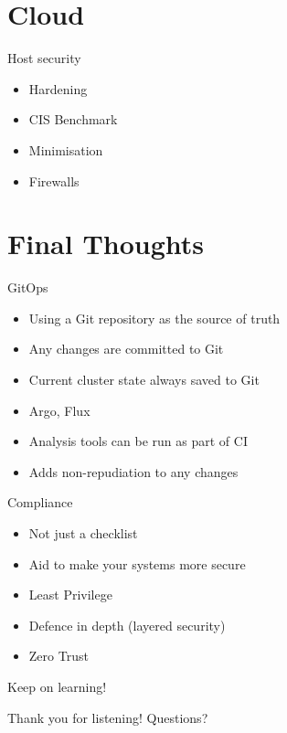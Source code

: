 \documentclass{dcpresentation}
\begin{document}
\section{Cloud}

\begin{frame}{Host security}
  \begin{itemize}
  \item Hardening
  \item CIS Benchmark
  \item Minimisation
  \item Firewalls
  \end{itemize}
\end{frame}

\section{Final Thoughts}

\begin{frame}{GitOps}
 \begin{itemize}
  \item Using a Git repository as the source of truth
  \item Any changes are committed to Git
  \item Current cluster state always saved to Git
  \item Argo, Flux
  \item Analysis tools can be run as part of CI
  \item Adds non-repudiation to any changes
 \end{itemize}
\end{frame}

\begin{frame}{Compliance}
  \begin{itemize}
  \item Not just a checklist
  \item Aid to make your systems more secure 
  \end{itemize}
\end{frame}

\begin{frame}
  \begin{itemize}
  \item Least Privilege
  \item Defence in depth (layered security)
  \item Zero Trust
  \end{itemize}
\end{frame}

\begin{frame}
 \begin{center}
  \LARGE Keep on learning!
 \end{center}  
\end{frame}

\begin{frame}
 \begin{center}
  \LARGE Thank you for listening!
  \vspace{20pt}
  \Large Questions?
 \end{center}  
\end{frame}
\end{document}
